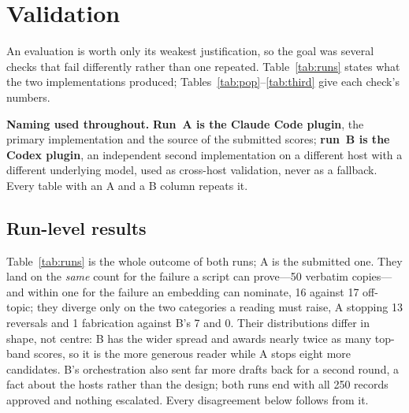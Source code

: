 \documentclass[conference]{IEEEtran}
\begin{document}
\section{Validation}

An evaluation is worth only its weakest justification, so the goal was
several checks that fail differently rather than one repeated.
Table~\ref{tab:runs} states what the two implementations produced;
Tables~\ref{tab:pop}--\ref{tab:third} give each check's numbers.

\textbf{Naming used throughout.} \textbf{Run~A is the Claude Code
plugin}, the primary implementation and the source of the submitted
scores; \textbf{run~B is the Codex plugin}, an independent second
implementation on a different host with a different underlying model,
used as cross-host validation, never as a fallback. Every table with an A
and a B column repeats it.

\subsection{Run-level results}
Table~\ref{tab:runs} is the whole outcome of both runs; A is the submitted
one. They land on the \emph{same} count for the failure a script can
prove---50 verbatim copies---and within one for the failure an embedding
can nominate, 16 against 17 off-topic; they diverge only on the two
categories a reading must raise, A stopping 13 reversals and 1 fabrication
against B's 7 and 0. Their distributions differ in shape, not centre: B has the wider spread
and awards nearly twice as many top-band scores, so it is the more
generous reader while A stops eight more candidates. B's orchestration
also sent far more drafts back for a second round, a fact about the hosts
rather than the design; both runs end with all 250 records approved and
nothing escalated. Every disagreement below follows from it.
\end{document}
